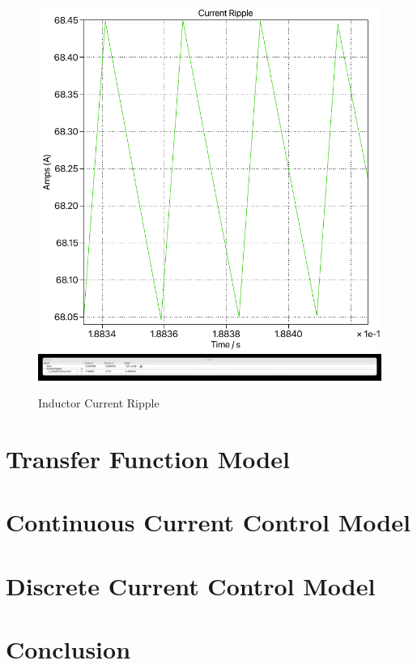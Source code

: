 \documentclass[12pt]{article}
\begin{document}
\begin{figure}[ht]
    \centering{}
    \includegraphics[width=\textwidth, height=0.4\textheight, keepaspectratio]{img/Switching Current Ripple.pdf}
    \includegraphics[width=\textwidth, height=0.4\textheight, keepaspectratio]{img/Switching Current Ripple Cursor.jpg}
    \caption{Inductor Current Ripple}
    \label{fig:switching-current-ripple}
\end{figure}

\section{Transfer Function Model}

\section{Continuous Current Control Model}

\section{Discrete Current Control Model}

\section{Conclusion}
\end{document}
